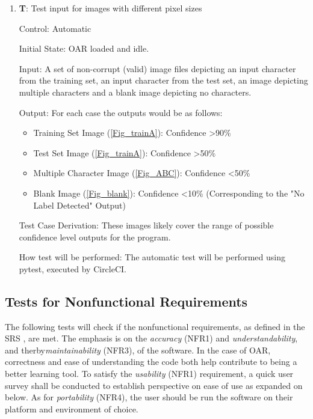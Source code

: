 \documentclass[12pt, titlepage]{article}
\newcounter{testnum} %
\begin{document}
\begin{enumerate}

  \item{\textbf{T\thetestnum \label{T_outputConf}}: Test input for images with different pixel sizes\\}
            
  Control: Automatic
            
  Initial State: OAR loaded and idle.
            
  Input: A set of non-corrupt (valid) image files depicting an input character from the training set, an input character from the test set,
  an image depicting multiple characters and a blank image depicting no characters.
            
  Output: For each case the outputs would be as follows:
  \begin{itemize}
    \item{Training Set Image (\ref{Fig_trainA}): Confidence >90\%}
    \item{Test Set Image (\ref{Fig_trainA}): Confidence >50\%}
    \item{Multiple Character Image (\ref{Fig_ABC}): Confidence <50\%}
    \item{Blank Image (\ref{Fig_blank}): Confidence <10\% (Corresponding to the "No Label Detected" Output)}
  \end{itemize}
 
  Test Case Derivation: These images likely cover the range of possible confidence level outputs for the program.
            
  How test will be performed: The automatic test will be performed using pytest, executed by CircleCI.
\end{enumerate}


\subsection{Tests for Nonfunctional Requirements}

The following tests will check if the nonfunctional requirements, as defined in the SRS \citep{SRS}, are 
met. The emphasis is on the \textit{accuracy} (NFR1) and \textit{understandability}, and 
therby\textit{maintainability} (NFR3), of the software. In the case of OAR, 
correctness and ease of understanding the code both help contribute to being a better learning tool.
To satisfy the \textit{usability} (NFR1) requirement, a quick user survey shall be
conducted to establish perspective on ease of use as expanded on below. As for \textit{portability} (NFR4),
the user should be run the software on their platform and environment of choice.
\end{document}
